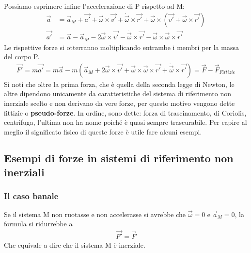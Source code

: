 \documentclass[10pt,a4paper]{article}
\begin{document}
Possiamo esprimere infine l'accelerazione di P rispetto ad M:
\begin{align*}
	\vec{a} &= \vec{a}_M + \vec{a'} + \vec{\omega} \times \vec{v'} + \dot{\vec{\omega}}\times \vec{r'}+ \vec{\omega}\times (\vec{v'} + \vec{\omega}\times\vec{r'}) \\
	\vec{a'} &= \vec{a} -\vec{a}_M - 2\vec{\omega} \times \vec{v'} - \dot{\vec{\omega}}\times \vec{r'}- \vec{\omega}\times \vec{\omega}\times\vec{r'}
\end{align*}
Le rispettive forze si otterranno moltiplicando entrambe i membri per la massa del corpo P.
\begin{align}\label{eq:pseudoaccelerazioni}
\vec{F'} = m\vec{a'} = m\vec{a} -m(\vec{a}_M + 2\vec{\omega} \times \vec{v'} + \vec{\omega}\times \vec{\omega}\times\vec{r'}+ \dot{\vec{\omega}}\times \vec{r'})= \vec{F} - \vec{F}_{Fittizie}
\end{align}
Si noti che oltre la prima forza, che è quella della seconda legge di Newton, le altre dipendono unicamente da caratteristiche del sistema di riferimento non inerziale scelto e non derivano da vere forze, per questo motivo vengono dette fittizie o \textbf{pseudo-forze}. In ordine, sono dette: forza di trascinamento, di Coriolis, centrifuga, l'ultima non ha nome poiché è quasi sempre trascurabile. Per capire al meglio il significato fisico di queste forze è utile fare alcuni esempi.
\subsection{Esempi di forze in sistemi di riferimento non inerziali}
\subsubsection*{Il caso banale}
Se il sistema M non ruotasse e non accelerasse si avrebbe che $\vec{\omega} = 0$ e $\vec{a}_M=0$, la formula si ridurrebbe a 
\begin{align*}
	\vec{F'} = \vec{F}
\end{align*}
Che equivale a dire che il sistema M è inerziale.
\end{document}
